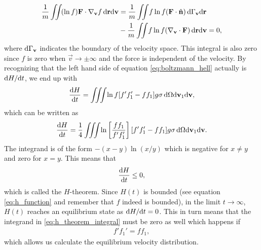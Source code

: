 \begin{align}
	\nonumber
	\frac{1}{m}\iint\! (\ln f) \mathbf F\cdot \nabla_\mathbf v f \,\mathrm{d}\mathbf r\mathrm{d}\mathbf v &= \frac{1}{m}\iint\! f\ln f (\mathbf F\cdot \hat{\mathbf n}) \,\mathrm{d}\Gamma_\mathbf v\mathrm{d}\mathbf r\\
	&- \frac{1}{m}\iint\! f\ln f (\nabla_\mathbf v \cdot \mathbf F) \,\mathrm{d}\mathbf r\mathrm{d}\mathbf v = 0,
\end{align}
where $\mathrm{d}\Gamma_\mathbf v$ indicates the boundary of the velocity space. This integral is also zero since $f$ is zero when $\vec v\rightarrow \pm \infty$ and the force is independent of the velocity. By recognizing that the left hand side of equation \eqref{eq:boltzmann_hell} actually is $\mathrm{d}H/\mathrm{d}t$, we end up with
\begin{align}
 	\frac{\mathrm{d}H}{\mathrm{d}t} = \iiint\! \ln f [f'f_1' - ff_1] g \sigma \,\mathrm{d}\Omega\mathrm{d}\mathbf v_1 \mathrm{d}\mathbf v,
\end{align}
which can be written as\cite{mcquarrie1973statistical}
\begin{align}
	\label{eq:h_theorem_integral}
 	\frac{\mathrm{d}H}{\mathrm{d}t} = \frac{1}{4}\iiint\! \ln\left[\frac{ff_1}{f'f_1'}\right] [f'f_1' - ff_1]g \sigma \, \mathrm{d}\Omega\mathrm{d}\mathbf v_1 \mathrm{d}\mathbf v.
\end{align}
The integrand is of the form $-(x-y)\ln(x/y)$ which is negative for $x\neq y$ and zero for $x=y$. This means that
\begin{align}
	\frac{\mathrm{d}H}{\mathrm{d}t} \leq 0,
\end{align}
which is called the $H$-theorem. Since $H(t)$ is bounded (see equation \eqref{eq:h_function} and remember that $f$ indeed is bounded), in the limit $t\rightarrow\infty$, $H(t)$ reaches an equilibrium state as $\mathrm{d}H/\mathrm{d}t = 0$. This in turn means that the integrand in \eqref{eq:h_theorem_integral} must be zero as well which happens if
\begin{align}
	\label{eq:equilibrium_f_relation}
	f'f_1' = ff_1,
\end{align}
which allows us calculate the equilibrium velocity distribution.

